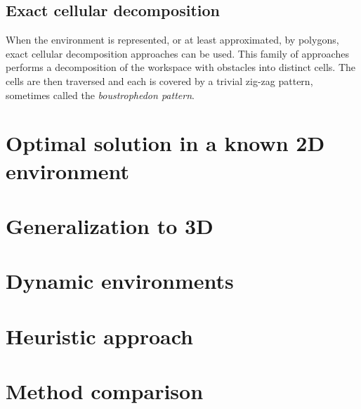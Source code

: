\documentclass[buriama8_dp.tex]{subfiles}
\begin{document}
\subsection{Exact cellular decomposition}
\label{subsec:label}
When the environment is represented, or at least approximated, by polygons, exact cellular decomposition approaches can be used. This family of approaches performs a decomposition of the workspace with obstacles into distinct cells. The cells are then traversed and each is covered by a trivial zig-zag pattern, sometimes called the \textit{boustrophedon pattern}.



\section{Optimal solution in a known 2D environment}

\section{Generalization to 3D}

\section{Dynamic environments}

\section{Heuristic approach}

\section{Method comparison}
\end{document}
